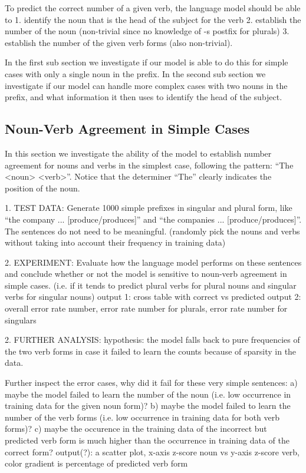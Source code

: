 \begin{multicols}{2}


To predict the correct number of a given verb,
the language model should be able to
1. identify the noun that is the head of the subject for the verb
2. establish the number of the noun (non-trivial since no knowledge of -s postfix for plurals)
3. establish the number of the given verb forms (also non-trivial).

In the first sub section we investigate if our model is able to
do this for simple cases with only a single noun in the prefix.
%
In the second sub section we investigate if our model can handle
more complex cases with two nouns in the prefix,
and what information it then uses to identify the head of the subject.

\subsection{Noun-Verb Agreement in Simple Cases}


In this section we investigate the ability of the model to
establish number agreement for nouns and verbs in the simplest case,
following the pattern: ``The <noun> <verb>''. Notice that
the determiner ``The'' clearly indicates the position of the noun.

1. TEST DATA: 
Generate 1000 simple prefixes in singular and plural form, like ``the company ... [produce/produces]'' 
and ``the companies ... [produce/produces]''.
The sentences do not need to be meaningful.
(randomly pick the nouns and verbs without taking into account their frequency in training data)

2. EXPERIMENT: 
Evaluate how the language model performs on these sentences 
and conclude whether or not the model is sensitive to noun-verb agreement in simple cases. 
(i.e. if it tends to predict plural verbs for plural nouns and singular verbs for singular nouns)
output 1: cross table with correct vs predicted
output 2: overall error rate number, error rate number for plurals, error rate number for singulars 


2. FURTHER ANALYSIS:
hypothesis: the model falls back to pure frequencies of the two verb forms
in case it failed to learn the counts because of sparsity in the data.

Further inspect the error cases, why did it fail for these very simple sentences:
a) maybe the model failed to learn the number of the noun (i.e. low occurrence in training data for the given noun form)?
b) maybe the model failed to learn the number of the verb forms (i.e. low occurrence in training data for both verb forms)?
c) maybe the occurence in the training data of the incorrect but predicted verb form is much higher than the occurrence 
in training data of the correct form?
output(?): a scatter plot, x-axis z-score noun vs y-axis z-score verb, color gradient is percentage of predicted verb form


\end{multicols}
